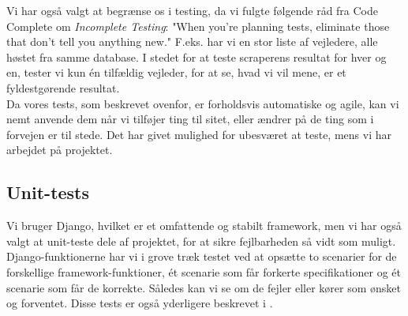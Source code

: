 \documentclass[12pt]{article}
\begin{document}
Vi har også valgt at begrænse os i testing, da vi fulgte følgende råd fra Code Complete\cite{cc} om \textit{Incomplete Testing}: "When you're planning tests, eliminate those that don't tell you anything new."{} F.eks. har vi en stor liste af vejledere, alle høstet fra samme database. I stedet for at teste scraperens resultat for hver og en, tester vi kun én tilfældig vejleder, for at se, hvad vi vil mene, er et fyldestgørende resultat. \\
Da vores tests, som beskrevet ovenfor, er forholdsvis automatiske og agile, kan vi nemt anvende dem når vi tilføjer ting til sitet, eller ændrer på de ting som i forvejen er til stede. Det har givet mulighed for ubesværet at teste, mens vi har arbejdet på projektet. \\

\subsection{Unit-tests}
Vi bruger Django, hvilket er et omfattende og stabilt framework, men vi har også valgt at unit-teste dele af projektet, for at sikre fejlbarheden så vidt som muligt. Django-funktionerne har vi i grove træk testet ved at opsætte to scenarier for de forskellige framework-funktioner, ét scenarie som får forkerte specifikationer og ét scenarie som får de korrekte. Således kan vi se om de fejler eller kører som ønsket og forventet. Disse tests er også yderligere beskrevet i .
\end{document}
